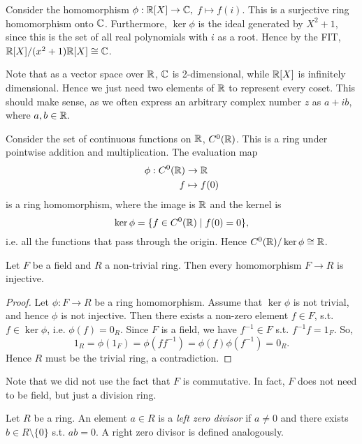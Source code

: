 \begin{example}
  Consider the homomorphism $\phi: \mathbb R[X]\to \mathbb C,$ $f\mapsto f(i)$. This is a surjective ring homomorphism onto $\mathbb C$.  
  Furthermore, $\ker\phi$ is the ideal generated by $X^2+1$, since this is the set of all real polynomials with $i$ as a root.
  Hence
  by the FIT, $\mathbb R[X]/(x^2+1)\mathbb R[X]\cong \mathbb C$. 
  
  Note that as a vector space over $\mathbb R$, $\mathbb C$ is 2-dimensional, while $\mathbb R[X]$ is infinitely dimensional. Hence we just need two elements of $\mathbb R$ to represent every coset. This should make sense, as we often express an arbitrary complex number $z$ as $a + ib,$ where $a,b \in \mathbb R.$
\end{example}
\begin{example}[In analysis]
  Consider the set of continuous functions on $\mathbb R$, $C^0(\mathbb R)$. This is a ring under pointwise addition and multiplication. The evaluation map 
  \begin{align*}
      \phi:C^0(\mathbb R)&\to \mathbb R
      \\ f &\mapsto f(0)
  \end{align*}
 is a ring homomorphism, where the image is $\mathbb R$ and the kernel is
  $$\ker\phi=\{f\in C^0(\mathbb R)\mid f(0)=0\},$$ i.e. all the functions that pass through the
  origin. Hence $C^0(\mathbb R)/\ker\phi \cong \mathbb R$.
\end{example}


\begin{theorem}
  Let $F$ be a field and $R$ a non-trivial ring. Then every
  homomorphism $F\to R$ is injective.
\end{theorem}
\begin{proof}
  Let $\phi:F\to R$ be a ring homomorphism. Assume that $\ker\phi$ is not trivial, and hence $\phi$ is not injective. Then there exists a non-zero element $f\in F$, s.t. $f\in\ker \phi$, i.e. $\phi(f)=0_R$. Since $F$ is a field, we have $f^{-1}\in F$ s.t. $f^{-1}f=1_F$. So,
  $$1_R=\phi(1_F)=\phi(f f^{-1})=\phi(f)\phi(f^{-1})=0_R.$$ Hence $R$ must be the trivial ring, a contradiction.
\end{proof}
\begin{remark}
  Note that we did not use the fact that $F$ is commutative. In fact, $F$ does not need to be field, but just a division ring.
\end{remark}

\begin{definition}
  Let $R$ be a ring. An element $a\in R$ is a \emph{left zero divisor} if $a\neq 0$ and
  there exists $b\in R\setminus \{0\}$ s.t. $ab=0$. A right zero divisor is defined analogously.
\end{definition}


